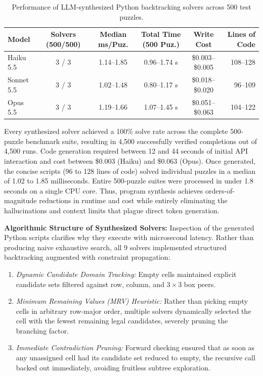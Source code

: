 \documentclass{article} %
\begin{document}
\begin{table}[t]
\caption{Performance of LLM-synthesized Python backtracking solvers across 500 test puzzles.}
\label{tab:llm_solver_results}
\begin{center}
\footnotesize
\setlength{\tabcolsep}{3pt}
\begin{tabular}{lccccr}
\toprule
\textbf{Model} & \textbf{Solvers (500/500)} & \textbf{Median ms/Puz.} & \textbf{Total Time (500 Puz.)} & \textbf{Write Cost} & \textbf{Lines of Code} \\
\midrule
Haiku 5.5  & 3 / 3 & 1.14--1.85 & 0.96--1.74 s & \$0.003--\$0.005 & 108--128 \\
Sonnet 5.5 & 3 / 3 & 1.02--1.48 & 0.80--1.17 s & \$0.018--\$0.020 & 96--109 \\
Opus 5.5   & 3 / 3 & 1.19--1.66 & 1.07--1.45 s & \$0.051--\$0.063 & 104--122 \\
\bottomrule
\end{tabular}
\end{center}
\end{table}

Every synthesized solver achieved a 100\% solve rate across the complete 500-puzzle benchmark suite, resulting in 4,500 successfully verified completions out of 4,500 runs. Code generation required between 12 and 44 seconds of initial API interaction and cost between \$0.003 (Haiku) and \$0.063 (Opus). Once generated, the concise scripts (96 to 128 lines of code) solved individual puzzles in a median of 1.02 to 1.85 milliseconds. Entire 500-puzzle suites were processed in under 1.8 seconds on a single CPU core. Thus, program synthesis achieves orders-of-magnitude reductions in runtime and cost while entirely eliminating the hallucinations and context limits that plague direct token generation.

\textbf{Algorithmic Structure of Synthesized Solvers:} Inspection of the generated Python scripts clarifies why they execute with microsecond latency. Rather than producing naive exhaustive search, all 9 solvers implemented structured backtracking augmented with constraint propagation:
\begin{enumerate}
    \item \textit{Dynamic Candidate Domain Tracking:} Empty cells maintained explicit candidate sets filtered against row, column, and $3 \times 3$ box peers.
    \item \textit{Minimum Remaining Values (MRV) Heuristic:} Rather than picking empty cells in arbitrary row-major order, multiple solvers dynamically selected the cell with the fewest remaining legal candidates, severely pruning the branching factor.
    \item \textit{Immediate Contradiction Pruning:} Forward checking ensured that as soon as any unassigned cell had its candidate set reduced to empty, the recursive call backed out immediately, avoiding fruitless subtree exploration.
\end{enumerate}
\end{document}
